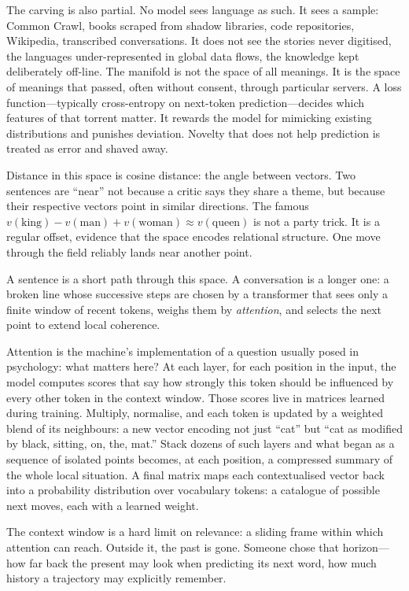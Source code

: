 \documentclass[12pt,a4paper]{article}
\begin{document}
The carving is also partial. No model sees language as such. It sees a sample: Common Crawl, books scraped from shadow libraries, code repositories, Wikipedia, transcribed conversations. It does not see the stories never digitised, the languages under-represented in global data flows, the knowledge kept deliberately off-line. The manifold is not the space of all meanings. It is the space of meanings that passed, often without consent, through particular servers. A loss function---typically cross-entropy on next-token prediction---decides which features of that torrent matter. It rewards the model for mimicking existing distributions and punishes deviation. Novelty that does not help prediction is treated as error and shaved away.

Distance in this space is cosine distance: the angle between vectors. Two sentences are ``near'' not because a critic says they share a theme, but because their respective vectors point in similar directions. The famous $v(\text{king}) - v(\text{man}) + v(\text{woman}) \approx v(\text{queen})$ is not a party trick. It is a regular offset, evidence that the space encodes relational structure. One move through the field reliably lands near another point.

A sentence is a short path through this space. A conversation is a longer one: a broken line whose successive steps are chosen by a transformer that sees only a finite window of recent tokens, weighs them by \emph{attention}, and selects the next point to extend local coherence.

Attention is the machine's implementation of a question usually posed in psychology: what matters here? At each layer, for each position in the input, the model computes scores that say how strongly this token should be influenced by every other token in the context window. Those scores live in matrices learned during training. Multiply, normalise, and each token is updated by a weighted blend of its neighbours: a new vector encoding not just ``cat'' but ``cat as modified by black, sitting, on, the, mat.'' Stack dozens of such layers and what began as a sequence of isolated points becomes, at each position, a compressed summary of the whole local situation. A final matrix maps each contextualised vector back into a probability distribution over vocabulary tokens: a catalogue of possible next moves, each with a learned weight.

The context window is a hard limit on relevance: a sliding frame within which attention can reach. Outside it, the past is gone. Someone chose that horizon---how far back the present may look when predicting its next word, how much history a trajectory may explicitly remember.
\end{document}
